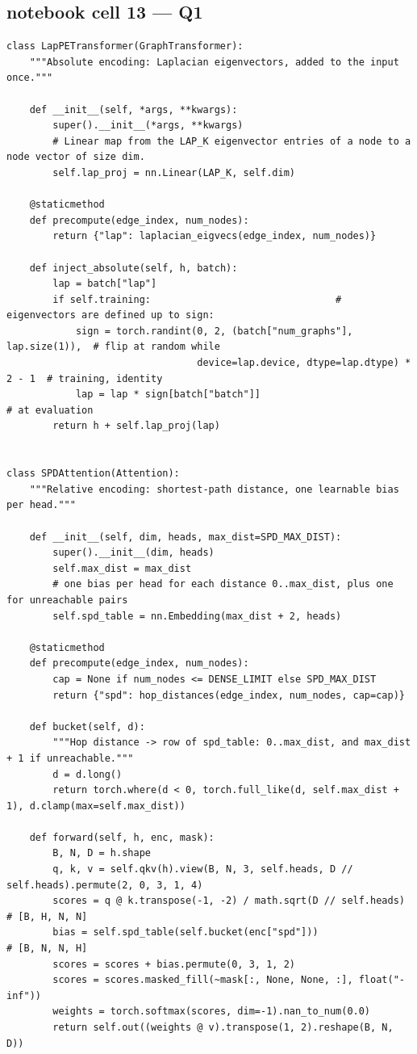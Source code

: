 \subsection*{notebook cell 13 — Q1}
\begin{lstlisting}[style=p1py]
class LapPETransformer(GraphTransformer):
    """Absolute encoding: Laplacian eigenvectors, added to the input once."""

    def __init__(self, *args, **kwargs):
        super().__init__(*args, **kwargs)
        # Linear map from the LAP_K eigenvector entries of a node to a node vector of size dim.
        self.lap_proj = nn.Linear(LAP_K, self.dim)

    @staticmethod
    def precompute(edge_index, num_nodes):
        return {"lap": laplacian_eigvecs(edge_index, num_nodes)}

    def inject_absolute(self, h, batch):
        lap = batch["lap"]
        if self.training:                                # eigenvectors are defined up to sign:
            sign = torch.randint(0, 2, (batch["num_graphs"], lap.size(1)),  # flip at random while
                                 device=lap.device, dtype=lap.dtype) * 2 - 1  # training, identity
            lap = lap * sign[batch["batch"]]                                  # at evaluation
        return h + self.lap_proj(lap)


class SPDAttention(Attention):
    """Relative encoding: shortest-path distance, one learnable bias per head."""

    def __init__(self, dim, heads, max_dist=SPD_MAX_DIST):
        super().__init__(dim, heads)
        self.max_dist = max_dist
        # one bias per head for each distance 0..max_dist, plus one for unreachable pairs
        self.spd_table = nn.Embedding(max_dist + 2, heads)

    @staticmethod
    def precompute(edge_index, num_nodes):
        cap = None if num_nodes <= DENSE_LIMIT else SPD_MAX_DIST
        return {"spd": hop_distances(edge_index, num_nodes, cap=cap)}

    def bucket(self, d):
        """Hop distance -> row of spd_table: 0..max_dist, and max_dist + 1 if unreachable."""
        d = d.long()
        return torch.where(d < 0, torch.full_like(d, self.max_dist + 1), d.clamp(max=self.max_dist))

    def forward(self, h, enc, mask):
        B, N, D = h.shape
        q, k, v = self.qkv(h).view(B, N, 3, self.heads, D // self.heads).permute(2, 0, 3, 1, 4)
        scores = q @ k.transpose(-1, -2) / math.sqrt(D // self.heads)      # [B, H, N, N]
        bias = self.spd_table(self.bucket(enc["spd"]))                     # [B, N, N, H]
        scores = scores + bias.permute(0, 3, 1, 2)
        scores = scores.masked_fill(~mask[:, None, None, :], float("-inf"))
        weights = torch.softmax(scores, dim=-1).nan_to_num(0.0)
        return self.out((weights @ v).transpose(1, 2).reshape(B, N, D))
\end{lstlisting}
